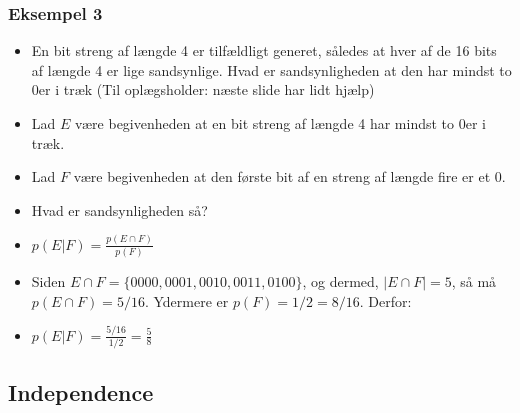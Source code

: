 \documentclass{beamer}
\begin{document}
\begin{frame}
  \frametitle{Eksempel 3}

  \begin{itemize}
  \item<1-> En bit streng af længde 4 er tilfældligt generet, således at hver af de 16 bits af længde 4 er lige sandsynlige. Hvad er sandsynligheden at den har mindst to 0er i træk (Til oplægsholder: næste slide har lidt hjælp)
    \item<2-> Lad $E$ være begivenheden at en bit streng af længde 4 har mindst to 0er i træk. 
    \item<2-> Lad $F$ være begivenheden at den første bit af en streng af længde fire er et 0. 
    \item<2-> Hvad er sandsynligheden så?
    \item<3-> $p(E|F) = \frac{p(E \cap F)}{p(F)}$
    \item<3-> Siden $E \cap F = \{0000,0001,0010,0011,0100\}$, og dermed, $|E \cap F| = 5$, så må $p(E \cap F) = 5/16$. Ydermere er $p(F) = 1/2 = 8/16$. Derfor:
    \item<3-> $p(E|F) = \frac{5/16}{1/2}= \frac{5}{8}$
  \end{itemize}
\end{frame}

\subsection{Independence}
\label{subsec:independence}
\end{document}
